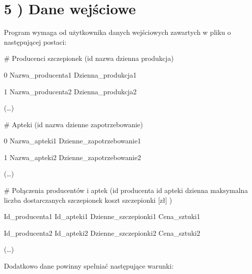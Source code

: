 \documentclass[]{article}
\begin{document}
    \section{5 ) Dane wejściowe}

    Program wymaga od użytkownika danych wejściowych zawartych w pliku o
    następującej postaci:\linebreak

    \# Producenci szczepionek (id \textbar{} nazwa \textbar{} dzienna
    produkcja)

    0 \textbar{} Nazwa\_producenta1 \textbar{} Dzienna\_produkcja1

    1 \textbar{} Nazwa\_producenta2 \textbar{} Dzienna\_produkcja2

    (\ldots{})

    \# Apteki (id \textbar{} nazwa \textbar{} dzienne zapotrzebowanie)

    0 \textbar{} Nazwa\_apteki1 \textbar{} Dzienne\_zapotrzebowanie1

    1 \textbar{} Nazwa\_apteki2 \textbar{} Dzienne\_zapotrzebowanie2

    (\ldots{})

    \# Połączenia producentów i aptek (id producenta \textbar{} id apteki
    \textbar{} dzienna maksymalna liczba dostarczanych szczepionek
    \textbar{} koszt szczepionki {[}zł{]} )

    Id\_producenta1 \textbar{} Id\_apteki1 \textbar{} Dzienne\_szczepionki1
    \textbar{} Cena\_sztuki1

    Id\_producenta2 \textbar{} Id\_apteki2 \textbar{} Dzienne\_szczepionki2
    \textbar{} Cena\_sztuki2

    (\ldots{})\linebreak

    Dodatkowo dane powinny spełniać następujące warunki:
\end{document}
